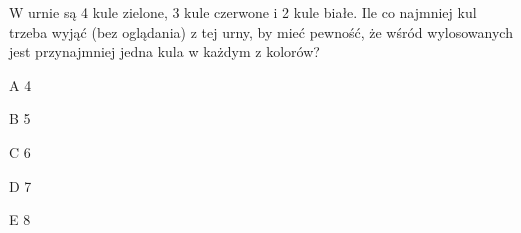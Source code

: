 \begin{tresc}
W urnie są 4 kule zielone, 3 kule czerwone i 2 kule białe. Ile co najmniej kul trzeba wyjąć (bez oglądania) z tej urny, by mieć pewność, że wśród wylosowanych jest przynajmniej jedna kula w każdym z kolorów?
\end{tresc}
\begin{wariant}{A} 4 \end{wariant}
\begin{wariant}{B} 5 \end{wariant}
\begin{wariant}{C} 6 \end{wariant}
\begin{wariant}{D} 7 \end{wariant}
\begin{wariant}{E} 8 \end{wariant}
